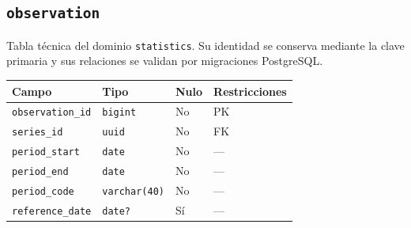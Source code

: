 \documentclass[11pt]{article}
\begin{document}
\subsection{\texttt{observation}}
Tabla técnica del dominio \texttt{statistics}. Su identidad se conserva mediante la clave primaria y sus relaciones se validan por migraciones PostgreSQL.
\begin{longtable}{>{\raggedright\arraybackslash}p{} p{} p{} p{}}
\toprule Campo & Tipo & Nulo & Restricciones \\ \midrule\endhead
\texttt{observation\_id} & \texttt{bigint} & No & PK \\
\texttt{series\_id} & \texttt{uuid} & No & FK \\
\texttt{period\_start} & \texttt{date} & No & --- \\
\texttt{period\_end} & \texttt{date} & No & --- \\
\texttt{period\_code} & \texttt{varchar(40)} & No & --- \\
\texttt{reference\_date} & \texttt{date?} & Sí & --- \\
\bottomrule\end{longtable}
\end{document}
